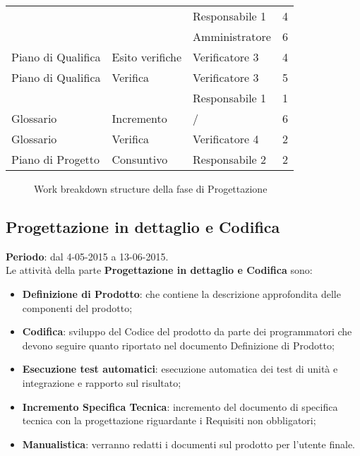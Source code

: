 {{\begin{longtable} [c]{| l | l | l | l |}
		&	&	Responsabile 1 & 4\\
		&	&	Amministratore & 6\\
		Piano di Qualifica & Esito verifiche & Verificatore 3 & 4 \\
		Piano di Qualifica & Verifica & Verificatore 3 & 5\\
		&	&	Responsabile 1 & 1\\
		Glossario & Incremento & / & 6 \\
		Glossario & Verifica & Verificatore 4 & 2 \\
		Piano di Progetto\ped{g} & Consuntivo & Responsabile 2 & 2\\
	\end{longtable}

	\begin{landscape}
		\thispagestyle{empty}
		\begin{figure}[H]
			\parbox[c][\textwidth][s]{\linewidth}{
			\centering
			\vspace*{\fill}
			\vspace*{\fill}
			\label{fig:wbsProgettazione}
			\caption{Work breakdown structure della fase di Progettazione}}
		\end{figure}
	\end{landscape}
}

\newpage
\subsection{Progettazione in dettaglio e Codifica}{
	\textbf{Periodo}: dal 4-05-2015 a 13-06-2015. \\
	 
	 Le attività della parte \textbf{Progettazione in dettaglio e Codifica} sono:
	 \begin{itemize}
		 \item \textbf{Definizione di Prodotto}: che contiene la descrizione approfondita delle componenti del prodotto;
		 \item \textbf{Codifica}: sviluppo del Codice del prodotto da parte dei programmatori che devono seguire quanto riportato nel documento Definizione di Prodotto;
		 \item \textbf{Esecuzione test automatici}: esecuzione automatica dei test di unità e integrazione e rapporto sul risultato;
		 \item \textbf{Incremento Specifica Tecnica}: incremento del documento di specifica tecnica con la progettazione riguardante i Requisiti non obbligatori;
		 \item \textbf{Manualistica}: verranno redatti i documenti sul prodotto per l'utente finale.
	 \end{itemize}

}}
